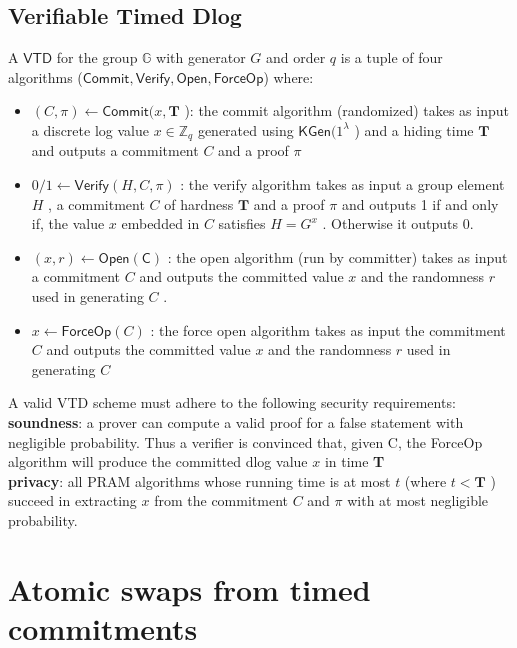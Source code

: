 \documentclass{article}      	%
\begin{document}
\subsection{Verifiable Timed Dlog}
A $\mathsf{VTD}$ for the group $\mathbb{G}$ with generator $G$ and order $q$ is a tuple of four algorithms ($\mathsf{Commit}, \mathsf{Verify}, \mathsf{Open}, \mathsf{ForceOp}$) where:
\begin{itemize}
	\item $(C, \pi) \gets \mathsf{Commit}(x, \textbf{T}$ ): the commit algorithm (randomized) takes as input a discrete log value $x \in \mathbb{Z}_q$ generated using $\mathsf{KGen}(1^{\lambda}$ ) and a hiding time $\textbf{T}$ and outputs a commitment $C$ and a proof $\pi$
	\item $0/1 \gets \mathsf{Verify}(H, C, \pi)$ : the verify algorithm takes as input a group element $H$ , a commitment $C$ of hardness $\textbf{T}$ and a proof $\pi$ and outputs 1 if and only if, the value $x$ embedded in $C$ satisfies $H = G^x$ . Otherwise it outputs 0.
	\item $(x, r) \gets \mathsf{Open(C)}$ : the open algorithm (run by committer) takes as input a commitment $C$ and outputs the committed value $x$ and the randomness $r$ used in generating $C$ .
	\item $x \gets \mathsf{ForceOp}(C)$ : the force open algorithm takes as input the commitment $C$ and outputs the committed value $x$ and the randomness $r$ used in generating $C$
\end{itemize}


A valid VTD scheme must adhere to the following security requirements: \\
\textbf{soundness}: a prover can compute a valid proof for a false statement with negligible probability. Thus a verifier is convinced that, given C, the ForceOp algorithm will produce the committed dlog value $x$ in time \textbf{T} \\
\textbf{privacy}: all PRAM algorithms whose running time is at most $t$ (where $t < \textbf{T}$ ) succeed in extracting $x$ from the commitment $C$ and $\pi$ with at most negligible probability. \\


\section{Atomic swaps from timed commitments}

\end{document}
